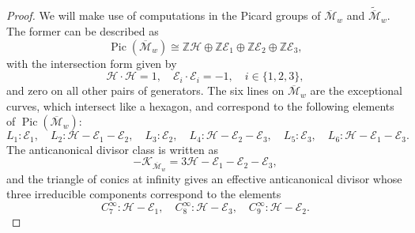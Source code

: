 \documentclass[a4paper,reqno]{amsart}
\numberwithin{equation}{section}
\newcommand{\Z}{\mathbb{Z}}
\newcommand{\Pic}{\operatorname{Pic}}
\numberwithin{equation}{section}
\begin{document}
\begin{proof}
    
    We will make use of computations in the Picard groups of $\overline{\mathcal{M}}_w$ and $\widetilde{\overline{\mathcal{M}}}_w$.
    The former can be described as 
$$\Pic(\overline{\mathcal{M}}_w)\cong \Z\mathcal{H}\oplus \Z \mathcal{E}_1\oplus\Z\mathcal{E}_2\oplus \Z \mathcal{E}_3,$$
with the intersection form given by 
$$\mathcal{H}\cdot \mathcal{H}=1, \quad \mathcal{E}_i \cdot \mathcal{E}_i=-1,\quad i \in \{1,2,3\},$$
and zero on all other pairs of generators.
The six lines on $\overline{\mathcal{M}}_{w}$ are the exceptional curves,  which intersect like a hexagon, and correspond to the following elements of $\Pic(\overline{\mathcal{M}}_w)$:
    $$L_1 :\mathcal{E}_1,\quad 
    L_2 :\mathcal{H}-\mathcal{E}_1-\mathcal{E}_2,\quad 
    L_3 : \mathcal{E}_2,\quad 
    L_4 :\mathcal{H}-\mathcal{E}_2-\mathcal{E}_3, \quad 
    L_5 :\mathcal{E}_3,\quad 
    L_6 : \mathcal{H}-\mathcal{E}_1-\mathcal{E}_3. $$
    The anticanonical divisor class is written as 
    $$-\mathcal{K}_{\overline{\mathcal{M}}_w} = 3 \mathcal{H}-\mathcal{E}_1-\mathcal{E}_2-\mathcal{E}_3,$$
    and the triangle of conics at infinity gives an effective anticanonical divisor whose three irreducible components correspond to the elements 
    $$C^{\infty}_7 : \mathcal{H}-\mathcal{E}_1,\quad 
    C^{\infty}_8 : \mathcal{H}-\mathcal{E}_3, \quad  
    C^{\infty}_9 : \mathcal{H}-\mathcal{E}_2.$$
    

\end{proof}
\end{document}
